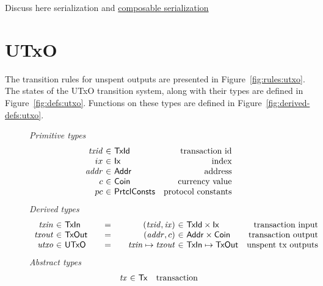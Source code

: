 \documentclass[11pt,a4paper]{article}
\newcommand{\Tx}{\type{Tx}}
\newcommand{\Ix}{\type{Ix}}
\newcommand{\TxId}{\type{TxId}}
\newcommand{\Addr}{\type{Addr}}
\newcommand{\UTxO}{\type{UTxO}}
\newcommand{\Coin}{\type{Coin}}
\newcommand{\PrtclConsts}{\type{PrtclConsts}}
\newcommand{\TxIn}{\type{TxIn}}
\newcommand{\TxOut}{\type{TxOut}}
\begin{document}
\begin{todo}
  Discuss here serialization and
  \href{https://iohk.myjetbrains.com/youtrack/issue/CDEC-628}{composable
    serialization}
\end{todo}

\section{UTxO}
\label{sec:state-trans-utxo-1}

The transition rules for unspent outputs are presented in
Figure~\ref{fig:rules:utxo}. The states of the UTxO transition system,
along with their types are defined in Figure~\ref{fig:defs:utxo}.
Functions on these types are defined in Figure~\ref{fig:derived-defs:utxo}.

\begin{figure*}
  \emph{Primitive types}
  \begin{equation*}
    \begin{array}{r@{~\in~}lr}
      \var{txid} & \TxId & \text{transaction id}\\
      ix & \Ix & \text{index}\\
      \var{addr} & \Addr & \text{address}\\
      c & \Coin & \text{currency value}\\
      pc & \PrtclConsts & \text{protocol constants}
    \end{array}
  \end{equation*}
  \emph{Derived types}
  \begin{equation*}
    \begin{array}{r@{~\in~}l@{\qquad=\qquad}r@{~\in~}lr}
      \var{txin}
      & \TxIn
      & (\var{txid}, \var{ix})
      & \TxId \times \Ix
      & \text{transaction input}
      \\
      \var{txout}
      & \type{TxOut}
      & (\var{addr}, c)
      & \Addr \times \Coin
      & \text{transaction output}
      \\
      \var{utxo}
      & \UTxO
      & \var{txin} \mapsto \var{txout}
      & \TxIn \mapsto \TxOut
      & \text{unspent tx outputs}
    \end{array}
  \end{equation*}
  \emph{Abstract types}
  \begin{equation*}
    \begin{array}{r@{~\in~}lr}
      \var{tx} & \Tx & \text{transaction}\\
    \end{array}

\end{equation*}
\end{figure*}
\end{document}
